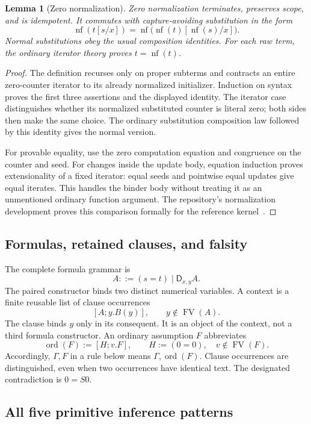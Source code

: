 \documentclass[11pt]{article}
\newtheorem{lemma}[theorem]{Lemma}
\theoremstyle{definition}
\newcommand{\nf}{\operatorname{nf}}
\newcommand{\D}{\mathsf D}
\newcommand{\FV}{\operatorname{FV}}
\begin{document}
\begin{lemma}[Zero normalization]\label{lem:normalization}
Zero normalization terminates, preserves scope, and is idempotent. It
commutes with capture-avoiding substitution in the form
\[
\nf(t[s/x])=\nf\bigl(\nf(t)[\nf(s)/x]\bigr).
\]
Normal substitutions obey the usual composition identities. For each raw
term, the ordinary iterator theory proves $t=\nf(t)$.
\end{lemma}
\begin{proof}
The definition recurses only on proper subterms and contracts an entire
zero-counter iterator to its already normalized initializer. Induction on
syntax proves the first three assertions and the displayed identity. The
iterator case distinguishes whether its normalized substituted counter is
literal zero; both sides then make the same choice. The ordinary substitution
composition law followed by this identity gives the normal version.

For provable equality, use the zero computation equation and congruence
on the counter and seed. For changes inside the update body, equation
induction proves extensionality of a fixed iterator: equal seeds and
pointwise equal updates give equal iterates. This handles the binder body
without treating it as an unmentioned ordinary function argument.
The repository's normalization development proves this comparison formally
for the reference kernel~\cite{normal}.
\end{proof}

\subsection{Formulas, retained clauses, and falsity}

The complete formula grammar is
\[
        A::=(s=t)\mid\D_{x,y}A.
\]
The paired constructor binds two distinct numerical variables. A context
is a finite reusable list of clause occurrences
\[
      [A;y.B(y)],\qquad y\notin\FV(A).
\]
The clause binds $y$ only in its consequent. It is an object of the context,
not a third formula constructor. An ordinary assumption $F$ abbreviates
\[
       \operatorname{ord}(F):=[H;v.F],
       \qquad H:=(0=0),\quad v\notin\FV(F).
\]
Accordingly, $\Gamma,F$ in a rule below means
$\Gamma,\operatorname{ord}(F)$. Clause occurrences are distinguished,
even when two occurrences have identical text.
The designated contradiction is $0=S0$.

\clearpage
\subsection{All five primitive inference patterns}
\end{document}
